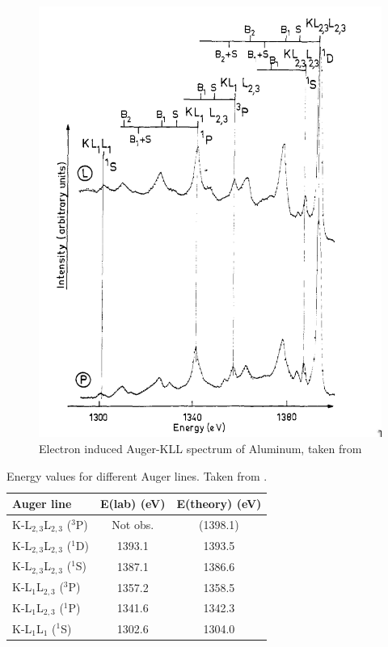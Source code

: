 \documentclass[12pt]{article}
\begin{document}

\begin{figure}
  \includegraphics[width=\linewidth]{augerspectrumal.png}
  \caption{Electron induced Auger-KLL spectrum of Aluminum, taken from \cite{dufor}}
  \label{fig:transitions}
\end{figure}

\begin{table}[h!]
    \centering
    \begin{tabular}{lcc}
        \toprule
        \textbf{Auger line} & \textbf{E(lab) (eV)} & \textbf{E(theory) (eV)} \\
        \midrule
        K-L$_{2,3}$L$_{2,3}$ ($^{3}$P) & Not obs. & (1398.1) \\
	K-L$_{2,3}$L$_{2,3}$ ($^{1}$D) & 1393.1 & 1393.5 \\
        K-L$_{2,3}$L$_{2,3}$ ($^{1}$S) & 1387.1 & 1386.6 \\
        K-L$_{1}$L$_{2,3}$ ($^{3}$P) & 1357.2 & 1358.5 \\
        K-L$_{1}$L$_{2,3}$ ($^{1}$P) & 1341.6 & 1342.3 \\
        K-L$_{1}$L$_{1}$ ($^{1}$S) & 1302.6 & 1304.0 \\
        \bottomrule
    \end{tabular}
    \caption{Energy values for different Auger lines. Taken from \cite{fu2024auger}.}
    \label{tab:transition}
\end{table}
\end{document}
